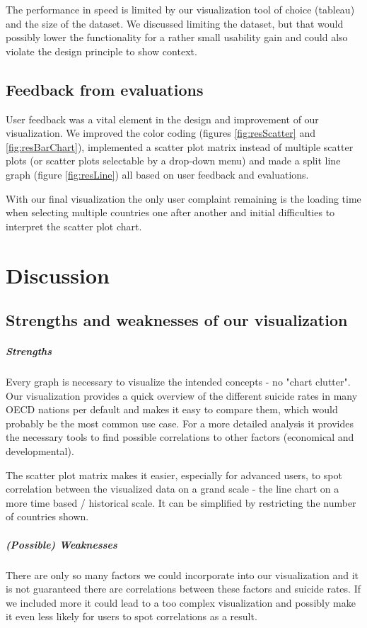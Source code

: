 \documentclass{vgtc}                          %
\begin{document}
The performance in speed is limited by our visualization tool of choice (tableau) and the size of the dataset. We discussed limiting the dataset, but that would possibly lower the functionality for a rather small usability gain and could also violate the design principle to show context.

\subsection{Feedback from evaluations}
User feedback was a vital element in the design and improvement of our visualization. We improved the color coding (figures \ref{fig:resScatter} and \ref{fig:resBarChart}), implemented a scatter plot matrix instead of multiple scatter plots (or scatter plots selectable by a drop-down menu) and made a split line graph (figure \ref{fig:resLine}) all based on user feedback and evaluations.

With our final visualization the only user complaint remaining is the loading time when selecting multiple countries one after another and initial difficulties to interpret the scatter plot chart.

\section{Discussion}

\subsection{Strengths and weaknesses of our visualization}

\subparagraph{Strengths}
Every graph is necessary to visualize the intended concepts - no "chart clutter". Our visualization provides a quick overview of the different suicide rates in many OECD nations per default and makes it easy to compare them, which would probably be the most common use case. For a more detailed analysis it provides the necessary tools to find possible correlations to other factors (economical and developmental).

The scatter plot matrix makes it easier, especially for advanced users, to spot correlation between the visualized data on a grand scale - the line chart on a more time based / historical scale. It can be simplified by restricting the number of countries shown.

\subparagraph{(Possible) Weaknesses}
There are only so many factors we could incorporate into our visualization and it is not guaranteed there are correlations between these factors and suicide rates. If we included more it could lead to a too complex visualization and possibly make it even less likely for users to spot correlations as a result.
\end{document}
